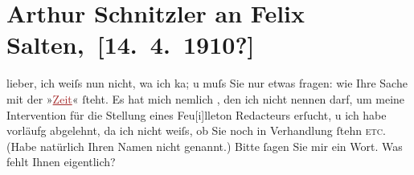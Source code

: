 

\renewcommand{\erwaehntePersonen}{Personen: Leopold von Andrian-Werburg, Anton Bettelheim, Hedwig Bleibtreu, Felix Salten}
\renewcommand{\erwaehnteInstitutionen}{Institutionen: Die Zeit}
\renewcommand{\erwaehnteOrte}{Orte: Sternwartestraße 71, Wien}
\renewcommand{\erwaehnteWerke}{Werke: Tagebuch}
\section[ Arthur Schnitzler an Felix Salten, {[}14. 4. 1910?{]}]{Arthur Schnitzler an Felix Salten, {[}14. 4. 1910?{]}}
\nopagebreak{}
\rehead{ }\normalsize\beginnumbering{}
\toendnotes[C]{\smallbreak\pagebreak[2]}
\toendnotes[C]{\smallbreak}
\pstart
           \noindent{}{\pb}lieber, ich weiſs nun nicht, wa{\geminationn} ich
                  \label{K_L03015-1v}\label{K_L03015-1h} ka{\geminationn}; u muſs Sie nur etwas fragen: wie Ihre Sache mit der
                  »\textcolor{brown}{\uline{Zeit}}{}\ledrightnote{\textcolor{brown}{Die Zeit}}« ſteht. Es hat mich nemlich {\pb}\label{K_L03015-2v}\label{K_L03015-2h}, den ich
               nicht nennen darf, um meine Intervention für die Stellung eines
                  Feu{[}i{]}lleton Redacteurs erſucht, u ich habe vorläufg abgelehnt,
               da ich nicht weiſs, ob Sie noch in Verhandlung {\pb}ſtehn \textsc{etc.} (Habe
               natürlich Ihren Namen nicht genannt.) Bitte ſagen Sie mir ein Wort. Was fehlt Ihnen
               eigentlich?\pend
           
